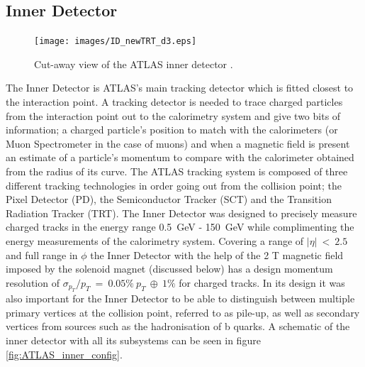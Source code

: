 	\subsection{Inner Detector}

		\begin{figure}[h!]
			\begin{center}
				\texttt{[image: images/ID\_newTRT\_d3.eps]}
			\end{center}
			\caption{Cut-away view of the ATLAS inner detector \cite{Aad:1129811}.}
			\label{fig:ATLAS_inner}
		\end{figure}

		The Inner Detector is ATLAS's main tracking detector which is fitted closest to the interaction point. A tracking detector is needed to trace charged particles from the interaction point out to the calorimetry system and give two bits of information; a charged particle's position to match with the calorimeters (or Muon Spectrometer in the case of muons) and when a magnetic field is present an estimate of a particle's momentum to compare with the calorimeter obtained from the radius of its curve. The  ATLAS tracking system is composed of three different tracking technologies in order going out from the collision point; the Pixel Detector (PD), the Semiconductor Tracker (SCT) and the Transition Radiation Tracker (TRT). The Inner Detector was designed to precisely measure charged tracks in the energy range 0.5~GeV - 150~GeV while complimenting the energy measurements of the calorimetry system. Covering a range of $|\eta|~<~2.5$ and full range in $\phi$ the Inner Detector with the help of the 2 T magnetic field imposed by the solenoid magnet (discussed below) has a design momentum resolution of $\sigma_{p_{T}}/p_{T}~=~0.05\%~p_{T}~\oplus~1\%$ for charged tracks. In its design it was also important for the Inner Detector to be able to distinguish between multiple primary vertices at the collision point, referred to as pile-up, as well as secondary vertices from sources such as the hadronisation of b quarks. A schematic of the inner detector with all its subsystems can be seen in figure \ref{fig:ATLAS_inner_config}.

